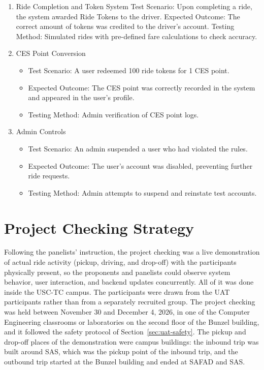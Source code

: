 \begin{enumerate}
    \item Ride Completion and Token System
Test Scenario: Upon completing a ride, the system awarded Ride Tokens to the driver.
Expected Outcome: The correct amount of tokens was credited to the driver’s account.
Testing Method: Simulated rides with pre-defined fare calculations to check accuracy.

    \item CES Point Conversion
        \begin{itemize}
            \item Test Scenario: A user redeemed 100 ride tokens for 1 CES point.
            \item Expected Outcome: The CES point was correctly recorded in the system and appeared in the user’s profile.
            \item Testing Method: Admin verification of CES point logs.
        \end{itemize}
        
    \item Admin Controls
        \begin{itemize}
            \item Test Scenario: An admin suspended a user who had violated the rules.
            \item Expected Outcome: The user’s account was disabled, preventing further ride requests.
            \item Testing Method: Admin attempts to suspend and reinstate test accounts.
        \end{itemize}
\end{enumerate}

\vspace{1em}

\section{Project Checking Strategy}\label{sec:checking}
\indent Following the panelists' instruction, the project checking was a live demonstration of actual ride activity (pickup, driving, and drop-off) with the participants physically present, so the proponents and panelists could observe system behavior, user interaction, and backend updates concurrently. All of it was done inside the USC-TC campus. The participants were drawn from the UAT participants rather than from a separately recruited group. The project checking was held between November 30 and December 4, 2026, in one of the Computer Engineering classrooms or laboratories on the second floor of the Bunzel building, and it followed the safety protocol of Section~\ref{sec:uat-safety}. The pickup and drop-off places of the demonstration were campus buildings: the inbound trip was built around SAS, which was the pickup point of the inbound trip, and the outbound trip started at the Bunzel building and ended at SAFAD and SAS.

